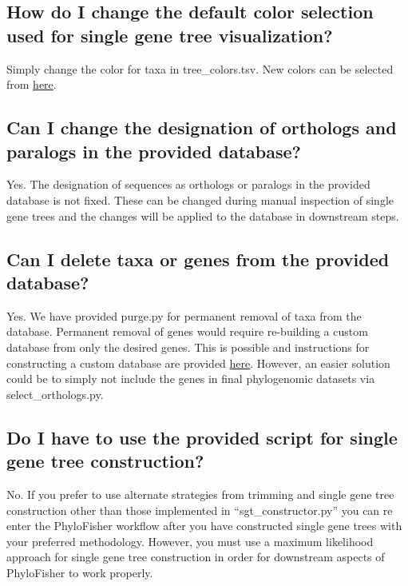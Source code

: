 \documentclass{article}
\begin{document}
    \subsection{How do I change the default color selection used for single gene tree visualization?}
    Simply change the color for taxa in tree\_colors.tsv. New colors can be selected from \href{http://amoeba.msstate.edu/phylofisher/pdfs/svgcolors.pdf}{here}.
    
    \subsection{Can I change the designation of orthologs and paralogs in the provided database?}
    Yes. The designation of sequences as orthologs or paralogs in the provided database is not fixed. These can be changed during manual inspection of single gene trees and the changes will be applied to the database in downstream steps.
    
    \subsection{Can I delete taxa or genes from the provided database?}
    Yes. We have provided purge.py for permanent removal of taxa from the database. Permanent removal of genes would require re-building a custom database from only the desired genes. This is possible and instructions for constructing a custom database are provided \hyperref[sec:customdb]{here}. However, an easier solution could be to simply not include the genes in final phylogenomic datasets via select\_orthologs.py. 
    
    \subsection{Do I have to use the provided script for single gene tree construction?}
    No. If you prefer to use alternate strategies from trimming and single gene tree construction other than those implemented in “sgt\_constructor.py” you can re enter the PhyloFisher workflow after you have constructed single gene trees with your preferred methodology. However, you must use a maximum likelihood approach for single gene tree construction in order for downstream aspects of PhyloFisher to work properly. 
    
    
\pagebreak
\printbibliography
\end{document}

